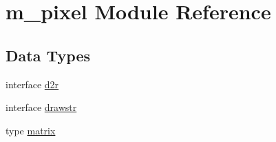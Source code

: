 \hypertarget{namespacem__pixel}{}\section{m\+\_\+pixel Module Reference}
\label{namespacem__pixel}
\subsection*{Data Types}
\begin{DoxyCompactItemize}
\item 
interface \mbox{\hyperlink{interfacem__pixel_1_1d2r}{d2r}}
\item 
interface \mbox{\hyperlink{interfacem__pixel_1_1drawstr}{drawstr}}
\item 
type \mbox{\hyperlink{structm__pixel_1_1matrix}{matrix}}
\end{DoxyCompactItemize}
